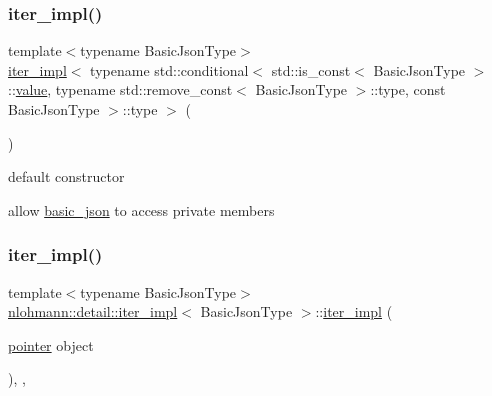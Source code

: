 \subsubsection{\texorpdfstring{iter\+\_\+impl()}{iter\_impl()}\hspace{0.1cm}{\footnotesize\ttfamily [1/3]}}
{\footnotesize\ttfamily template$<$typename Basic\+Json\+Type$>$ \\
\hyperlink{classnlohmann_1_1detail_1_1iter__impl}{iter\+\_\+impl}$<$ typename std\+::conditional$<$ std\+::is\+\_\+const$<$ Basic\+Json\+Type $>$\+::\hyperlink{classnlohmann_1_1detail_1_1iter__impl_ab447c50354c6611fa2ae0100ac17845c}{value}, typename std\+::remove\+\_\+const$<$ Basic\+Json\+Type $>$\+::type, const Basic\+Json\+Type $>$\+::type $>$ (\begin{DoxyParamCaption}{ }\end{DoxyParamCaption})\hspace{0.3cm}{\ttfamily [default]}}



default constructor 

allow \hyperlink{classnlohmann_1_1basic__json}{basic\+\_\+json} to access private members \mbox{\label{classnlohmann_1_1detail_1_1iter__impl_a88a00484ac201c52fc5f613d88a2918b}} 
\subsubsection{\texorpdfstring{iter\+\_\+impl()}{iter\_impl()}\hspace{0.1cm}{\footnotesize\ttfamily [2/3]}}
{\footnotesize\ttfamily template$<$typename Basic\+Json\+Type$>$ \\
\hyperlink{classnlohmann_1_1detail_1_1iter__impl}{nlohmann\+::detail\+::iter\+\_\+impl}$<$ Basic\+Json\+Type $>$\+::\hyperlink{classnlohmann_1_1detail_1_1iter__impl}{iter\+\_\+impl} (\begin{DoxyParamCaption}\item[{\hyperlink{classnlohmann_1_1detail_1_1iter__impl_a69e52f890ce8c556fd68ce109e24b360}{pointer}}]{object }\end{DoxyParamCaption})\hspace{0.3cm}{\ttfamily [inline]}, {\ttfamily [explicit]}, {\ttfamily [noexcept]}}



